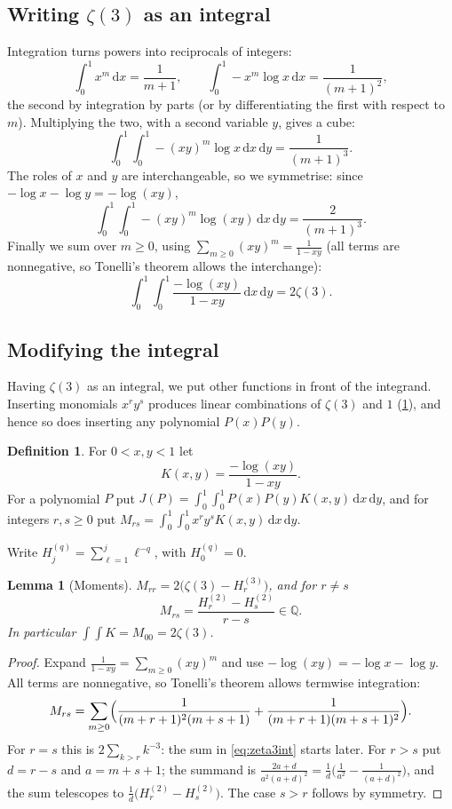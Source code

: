 \documentclass[11pt]{article}
\newcommand{\Q}{\mathbb{Q}}
\newcommand{\dd}{\,\mathrm{d}}
\theoremstyle{plain}
\newtheorem{lemma}[theorem]{Lemma}
\theoremstyle{definition}
\newtheorem{definition}[theorem]{Definition}
\theoremstyle{remark}
\begin{document}
\subsection{Writing \texorpdfstring{$\zeta(3)$}{zeta(3)} as an integral}

Integration turns powers into reciprocals of integers:
\[
  \int_0^1x^m\dd x=\frac1{m+1},\qquad \int_0^1-x^m\log x\dd x=\frac1{(m+1)^2},
\]
the second by integration by parts (or by differentiating the first with respect to $m$).
Multiplying the two, with a second variable $y$, gives a cube:
\[
  \int_0^1\!\!\int_0^1-(xy)^m\log x\dd x\dd y=\frac1{(m+1)^3}.
\]
The roles of $x$ and $y$ are interchangeable, so we symmetrise: since $-\log x-\log y=-\log(xy)$,
\[
  \int_0^1\!\!\int_0^1-(xy)^m\log(xy)\dd x\dd y=\frac2{(m+1)^3}.
\]
Finally we sum over $m\ge0$, using $\sum_{m\ge0}(xy)^m=\frac1{1-xy}$ (all terms are nonnegative,
so Tonelli's theorem allows the interchange):
\begin{equation}\label{eq:zeta3int}
  \int_0^1\!\!\int_0^1\frac{-\log(xy)}{1-xy}\dd x\dd y=2\zeta(3).
\end{equation}

\subsection{Modifying the integral}

Having $\zeta(3)$ as an integral, we put other functions in front of the integrand. Inserting monomials $x^ry^s$ produces linear combinations of $\zeta(3)$ and $1$
(\cref{lem:moments}), and hence so does inserting any polynomial $P(x)P(y)$.

\begin{definition}
For $0<x,y<1$ let
\[
  K(x,y)=\frac{-\log(xy)}{1-xy}.
\]
For a polynomial $P$ put $J(P)=\int_0^1\!\int_0^1P(x)P(y)K(x,y)\dd x\dd y$, and for integers
$r,s\ge0$ put $M_{rs}=\int_0^1\!\int_0^1x^ry^sK(x,y)\dd x\dd y$.
\end{definition}

Write $H^{(q)}_j=\sum_{\ell=1}^j\ell^{-q}$, with $H^{(q)}_0=0$.

\begin{lemma}[Moments]\label{lem:moments}
$M_{rr}=2\bigl(\zeta(3)-H^{(3)}_r\bigr)$, and for $r\ne s$
\[
  M_{rs}=\frac{H^{(2)}_r-H^{(2)}_s}{r-s}\in\Q .
\]
In particular $\int\!\!\int K=M_{00}=2\zeta(3)$.
\end{lemma}

\begin{proof}
Expand $\frac1{1-xy}=\sum_{m\ge0}(xy)^m$ and use $-\log(xy)=-\log x-\log y$. All terms are
nonnegative, so Tonelli's theorem allows termwise integration:
\[
  M_{rs}=\sum_{m\ge0}\Bigl(\frac1{(m+r+1)^2(m+s+1)}+\frac1{(m+r+1)(m+s+1)^2}\Bigr).
\]
For $r=s$ this is $2\sum_{k>r}k^{-3}$: the sum in \eqref{eq:zeta3int} starts later. For $r>s$ put $d=r-s$ and $a=m+s+1$; the summand is
$\frac{2a+d}{a^2(a+d)^2}=\frac1d\bigl(\frac1{a^2}-\frac1{(a+d)^2}\bigr)$, and the sum telescopes to
$\frac1d\bigl(H^{(2)}_r-H^{(2)}_s\bigr)$. The case $s>r$ follows by symmetry.
\end{proof}
\end{document}
